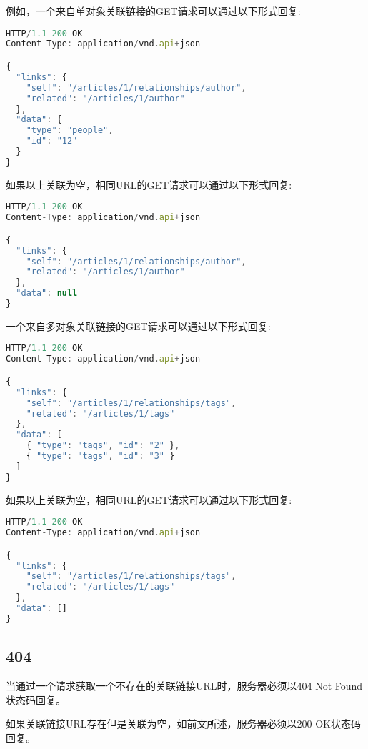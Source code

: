 例如，一个来自单对象关联链接的GET请求可以通过以下形式回复:





\begin{lstlisting}[language=JavaScript]
HTTP/1.1 200 OK
Content-Type: application/vnd.api+json

{
  "links": {
    "self": "/articles/1/relationships/author",
    "related": "/articles/1/author"
  },
  "data": {
    "type": "people",
    "id": "12"
  }
}
\end{lstlisting}


如果以上关联为空，相同URL的GET请求可以通过以下形式回复:

\begin{lstlisting}[language=JavaScript]
HTTP/1.1 200 OK
Content-Type: application/vnd.api+json

{
  "links": {
    "self": "/articles/1/relationships/author",
    "related": "/articles/1/author"
  },
  "data": null
}
\end{lstlisting}

一个来自多对象关联链接的GET请求可以通过以下形式回复:




\begin{lstlisting}[language=JavaScript]
HTTP/1.1 200 OK
Content-Type: application/vnd.api+json

{
  "links": {
    "self": "/articles/1/relationships/tags",
    "related": "/articles/1/tags"
  },
  "data": [
    { "type": "tags", "id": "2" },
    { "type": "tags", "id": "3" }
  ]
}
\end{lstlisting}


如果以上关联为空，相同URL的GET请求可以通过以下形式回复:


\begin{lstlisting}[language=JavaScript]
HTTP/1.1 200 OK
Content-Type: application/vnd.api+json

{
  "links": {
    "self": "/articles/1/relationships/tags",
    "related": "/articles/1/tags"
  },
  "data": []
}
\end{lstlisting}

\subsection{404}

当通过一个请求获取一个不存在的关联链接URL时，服务器必须以404 Not Found状态码回复。

如果关联链接URL存在但是关联为空，如前文所述，服务器必须以200 OK状态码回复。

